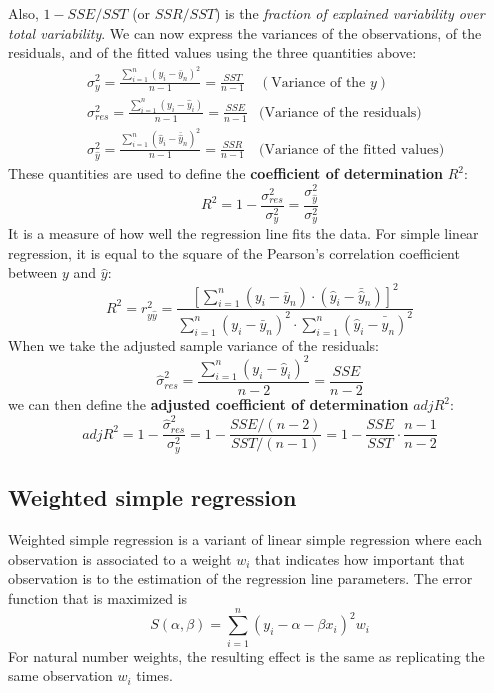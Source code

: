 Also, $1 - SSE/SST$ (or $SSR/SST$) is the \textit{fraction of explained variability over total variability}. We can now express the variances of the observations, of the residuals, and of the fitted values using the three quantities above:
\begin{align*}
    &\sigma_y^2 = \frac{\sum_{i=1}^n (y_i - \bar{y}_n)^2}{n-1} = \frac{SST}{n-1} &(\text{Variance of the } y)\\
    &\sigma_{res}^2 = \frac{\sum_{i=1}^n (y_i - \hat{y}_i)}{n-1} = \frac{SSE}{n-1} &\text{(Variance of the residuals)}\\
    &\sigma_{\hat{y}}^2 = \frac{\sum_{i=1}^n (\hat{y}_i - \bar{\hat{y}}_n)^2}{n-1} = \frac{SSR}{n-1} &\text{(Variance of the fitted values)}
\end{align*}
These quantities are used to define the \textbf{coefficient of determination} $R^2$:
\begin{equation*}
    R^2 = 1 - \frac{\sigma_{res}^2}{\sigma_y^2} = \frac{\sigma_{\hat{y}}^2}{\sigma_y^2}
\end{equation*}   
It is a measure of how well the regression line fits the data. For simple linear regression, it is equal to the square of the Pearson's correlation coefficient between $y$ and $\hat{y}$:
\begin{equation*}
    R^2 = r_{y\hat{y}}^2 = \frac{[\sum_{i=1}^n (y_i - \bar{y}_n) \cdot (\hat{y}_i - \bar{\hat{y}}_n)]^2}{\sum_{i=1}^n (y_i - \bar{y}_n)^2 \cdot \sum_{i=1}^n (\hat{y}_i - \bar{\hat{y}}_n)^2}
\end{equation*}   
When we take the adjusted sample variance of the residuals:
\begin{equation*}
    \hat{\sigma}_{res}^2 = \frac{\sum_{i=1}^n (y_i - \hat{y}_i)^2}{n-2} = \frac{SSE}{n-2}
\end{equation*}   
we can then define the \textbf{adjusted coefficient of determination} $\textit{adj}{R}^2$:
\begin{equation*}
    \textit{adj}{R}^2 = 1 - \frac{\hat{\sigma}_{res}^2}{\sigma_y^2} = 1 - \frac{SSE/(n-2)}{SST/(n-1)} = 1 - \frac{SSE}{SST} \cdot \frac{n-1}{n-2}
\end{equation*}   

\subsection{Weighted simple regression}
Weighted simple regression is a variant of linear simple regression where each observation is associated to a weight $w_i$ that indicates how important that observation is to the estimation of the regression line parameters. The error function that is maximized is
\begin{equation*}
    S(\alpha, \beta) = \sum_{i=1}^n (y_i - \alpha - \beta x_i)^2 w_i
\end{equation*}   
For natural number weights, the resulting effect is the same as replicating the same observation $w_i$ times.

